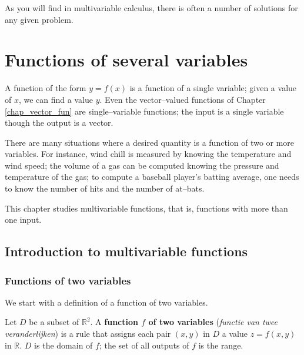 \begin{savequote}[75mm]
As you will find in multivariable calculus, there is often a number of solutions for any given problem.
\end{savequote}

\chapter{Functions of several variables}
\label{chap_multi_var}
\graphicspath{{figures/Multi_Var/}}
A function of the form $y=f(x)$ is a function of a single variable; given a value of $x$, we can find a value $y$. Even the vector--valued functions of Chapter \ref{chap_vector_fun} are single--variable functions; the input is a single variable though the output is a vector.

There are many situations where a desired quantity is a function of two or more variables. For instance, wind chill is measured by knowing the temperature and wind speed; the volume of a gas can be computed knowing the pressure and temperature of the gas; to compute a baseball player's batting average, one needs to know the number of hits and the number of at--bats. 

This chapter studies multivariable functions, that is, functions with more than one input.

\section{Introduction to multivariable functions}\label{sec:multi_intro}
\subsection{Functions of two variables}
We start with  a definition of a function of two variables. 

\begin{definition}\label{def:multi2}
Let $D$ be a subset of $\mathbb{R}^2$. A \textbf{function $f$ of two variables} (\textit{functie van twee veranderlijken}) is a rule that assigns each pair $(x,y)$ in $D$ a value $z=f(x,y)$ in $\mathbb{R}$. $D$ is the domain of $f$; the set of all outputs of $f$ is the range.
 
\end{definition}

